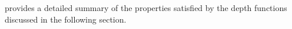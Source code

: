 \textcite[Table 2]{mosler-mozharovskyi-2022} provides a detailed summary of
the properties satisfied by the depth functions discussed in the following
section.














